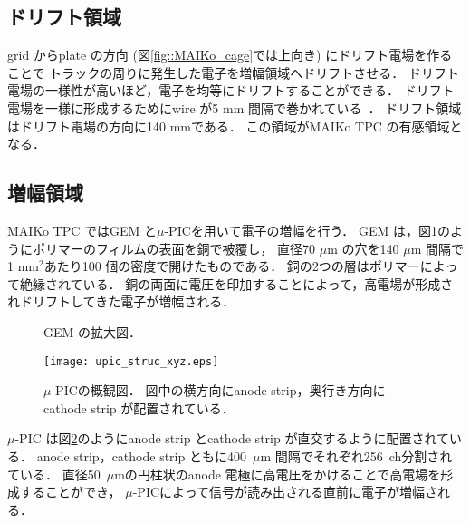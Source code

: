 \documentclass[../master]{subfiles}
\begin{document}

\subsection{ドリフト領域}
grid からplate の方向 (図\ref{fig::MAIKo_cage}では上向き) にドリフト電場を作ることで
トラックの周りに発生した電子を増幅領域へドリフトさせる．
ドリフト電場の一様性が高いほど，電子を均等にドリフトすることができる．
ドリフト電場を一様に形成するためにwire が5 mm 間隔で巻かれている~\cite{furuno}．
ドリフト領域はドリフト電場の方向に140 mmである．
この領域がMAIKo TPC の有感領域となる．

\subsection{増幅領域}
MAIKo TPC ではGEM と$\mu$-PICを用いて電子の増幅を行う．
GEM は，図\ref{pic::GEM}のようにポリマーのフィルムの表面を銅で被覆し，
直径70 $\mu$m の穴を140 $\mu$m 間隔で1 mm$^2$あたり100 個の密度で開けたものである．
銅の2つの層はポリマーによって絶縁されている．
銅の両面に電圧を印加することによって，高電場が形成されドリフトしてきた電子が増幅される．
\begin{figure}
  \centering
  \caption{GEM の拡大図．}
  \label{pic::GEM}  
\end{figure}
\begin{figure}
  \centering
  \texttt{[image: upic\_struc\_xyz.eps]}
  \caption[$\mu$-PICの概観図．]{$\mu$-PICの概観図．
    図中の横方向にanode strip，奥行き方向にcathode strip が配置されている．
  }
  \label{fig::mupic}
\end{figure}
$\mu$-PIC は図\ref{fig::mupic}のようにanode strip とcathode strip が直交するように配置されている．
anode strip，cathode strip ともに400~$\mu$m 間隔でそれぞれ256~ch分割されている．
直径50~$\mu$mの円柱状のanode 電極に高電圧をかけることで高電場を形成することができ，
$\mu$-PICによって信号が読み出される直前に電子が増幅される．
\end{document}
